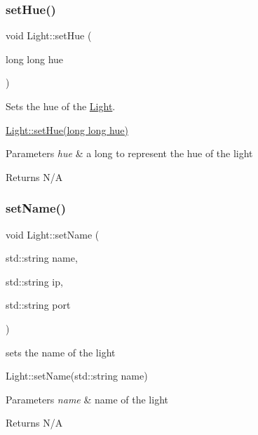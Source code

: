 \subsubsection{\texorpdfstring{set\+Hue()}{setHue()}}
{\footnotesize\ttfamily void Light\+::set\+Hue (\begin{DoxyParamCaption}\item[{long long}]{hue }\end{DoxyParamCaption})}



Sets the hue of the \hyperlink{class_light}{Light}. 

\hyperlink{class_light_addc99af8c89bfd9c0ebd8908bd290ba7}{Light\+::set\+Hue(long long hue)} 
\begin{DoxyParams}{Parameters}
{\em hue} & a long to represent the hue of the light \\
\hline
\end{DoxyParams}
\begin{DoxyReturn}{Returns}
N/A 
\end{DoxyReturn}
\mbox{\label{class_light_aaa50f42697fdae36ec4b021098fac974}} 
\subsubsection{\texorpdfstring{set\+Name()}{setName()}}
{\footnotesize\ttfamily void Light\+::set\+Name (\begin{DoxyParamCaption}\item[{std\+::string}]{name,  }\item[{std\+::string}]{ip,  }\item[{std\+::string}]{port }\end{DoxyParamCaption})}



sets the name of the light 

Light\+::set\+Name(std\+::string name) 
\begin{DoxyParams}{Parameters}
{\em name} & name of the light \\
\hline
\end{DoxyParams}
\begin{DoxyReturn}{Returns}
N/A 
\end{DoxyReturn}
\mbox{\label{class_light_ab22e6d81d0ccb2f844d404e2e038f9a2}} 
